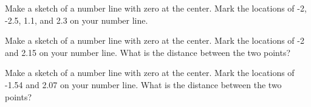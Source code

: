 
\begin{problem}
\item Make a sketch of a number line with zero at the center.  Mark
  the locations of -2, -2.5, 1.1, and 2.3 on your number line.

  \vfill

\item Make a sketch of a number line with zero at the center.  Mark
  the locations of -2 and 2.15 on your number line. What is the
  distance between the two points?

  \vfill

\item Make a sketch of a number line with zero at the center.  Mark
  the locations of -1.54 and 2.07 on your number line. What is the
  distance between the two points?

  \vfill

\end{problem}


